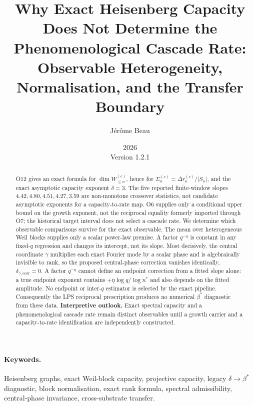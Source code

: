 \documentclass[11pt]{article}
\title{Why Exact Heisenberg Capacity Does Not Determine the Phenomenological Cascade Rate:\\
Observable Heterogeneity, Normalisation, and the Transfer Boundary}
\author{J\'er\^ome Beau}
\date{2026\\Version 1.2.1}
\begin{document}
  \maketitle

  \begin{abstract}
    O12 gives an exact formula for $\dim W_{\leq n}^{(c)}$, hence for
    $\Sigma_n^{(c)}=\Delta r_n^{(c)}/|S_n|$, and the exact asymptotic capacity exponent $\delta=3$.
    The five reported finite-window slopes $4.42,4.80,4.51,4.27,3.59$ are non-monotone crossover
    statistics, not candidate asymptotic exponents for a capacity-to-rate map.
    O6 supplies only a conditional upper bound on the growth exponent, not the reciprocal equality
    formerly imported through O7; the historical target interval does not select a cascade rate.
    We determine which observable comparisons survive for the exact observable.
    The mean over heterogeneous Weil blocks supplies only a scalar power-law premise.
    A factor $q^{-\eta}$ is constant in any fixed-$q$ regression and changes its intercept, not its
    slope.
    Most decisively, the central coordinate $\gamma$ multiplies each exact Fourier mode by a scalar
    phase and is algebraically invisible to rank, so the proposed central-phase correction vanishes
    identically, $\delta_{\gamma,\mathrm{corr}}=0$.
    A factor $q^{-\eta}$ cannot define an endpoint correction from a fitted slope alone: a true
    endpoint exponent contains $+\eta\log q/\log n^*$ and also depends on the fitted amplitude.
    No endpoint or inter-$q$ estimator is selected by the exact pipeline.
    Consequently the LPS reciprocal prescription produces no numerical $\beta^{*}$ diagnostic from
    these data.
    \textbf{Interpretive outlook.}
    Exact spectral capacity and a phenomenological cascade rate remain distinct observables until a
    growth carrier and a capacity-to-rate identification are independently constructed.
  \end{abstract}

  \paragraph{Keywords.}
    Heisenberg graphs, exact Weil-block capacity, projective capacity, legacy
    \(\delta \to \beta^*\) diagnostic, block normalisation, exact rank formula, spectral admissibility,
    central-phase invariance, cross-substrate transfer.

    \clearpage
    \tableofcontents

    \clearpage
\end{document}
